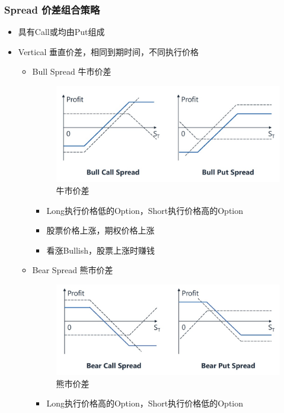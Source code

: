 \documentclass[a4paper,6pt,twoside,openany]{article}
\begin{document}
\subsubsection{Spread 价差组合策略}
\begin{itemize}
\item 具有Call或均由Put组成
\item Vertical 垂直价差，相同到期时间，不同执行价格
  \begin{itemize}
  \item Bull Spread 牛市价差
    \begin{figure}[!htbp]
      \centering \includegraphics[width=150mm]{Strategy_Bull_Spread.jpg}
      \caption{牛市价差}
    \end{figure}
    \begin{itemize}
    \item Long执行价格低的Option，Short执行价格高的Option
    \item 股票价格上涨，期权价格上涨
    \item 看涨Bullish，股票上涨时赚钱
    \end{itemize}
  \item Bear Spread 熊市价差
    \begin{figure}[!htbp]
      \centering \includegraphics[width=150mm]{Strategy_Bear_Spread.jpg}
      \caption{熊市价差}
    \end{figure}
    \begin{itemize}
    \item Long执行价格高的Option，Short执行价格低的Option

\end{itemize}
\end{itemize}
\end{itemize}
\end{document}
